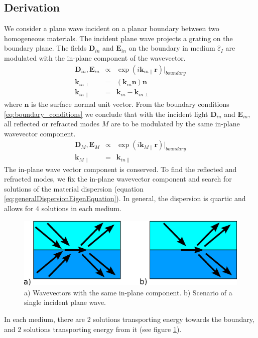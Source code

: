 \documentclass[12pt,a4paper,twoside,openright,BCOR10mm,headsepline,titlepage,abstracton,chapterprefix,final]{scrreprt}
\newcommand\Vector[1]{{\mathbf{#1}}}
\newcommand\Location{\Vector{r}}
\newcommand\wavenumber{k}
\newcommand\Wavevector{\Vector{\wavenumber}}
\newcommand\Tensor[1]{\hat{#1}}
\newcommand\scalarEfield{E}
\newcommand\scalarDfield{D}
\newcommand\Efield{\Vector{\scalarEfield}}
\newcommand\Dfield{\Vector{\scalarDfield}}
\newcommand\permittivity{\Tensor{\scalarpermittivity}}
\newcommand\scalarpermittivity{\varepsilon}
\newcommand\materialone{I}
\begin{document}
\subsection{Derivation}
We consider a plane wave incident on a planar boundary between two homogeneous materials.
The incident plane wave projects a grating on the boundary plane. 
The fields $\Dfield_{in}$ and $\Efield_{in}$ on the boundary in medium $\permittivity_\materialone$ are modulated with the in-plane component of the wavevector. 
\begin{eqnarray}
 \Dfield_{in}, \Efield_{in} &\propto& \exp( i \Wavevector_{in\parallel} \Location)|_{boundary} \\
 \Wavevector_{in\perp} &=& ( \Wavevector_{in} \Vector{n} ) \Vector{n} \\
 \Wavevector_{in\parallel} &=& \Wavevector_{in} - \Wavevector_{in\perp}
\end{eqnarray}
where $\Vector{n}$ is the surface normal unit vector.
From the boundary conditions \ref{eq:boundary_conditions} we conclude that with the incident light $\Dfield_{in}$ and $\Efield_{in}$, 
all reflected or refracted modes $M$ are to be modulated by the same in-plane wavevector component.
\begin{eqnarray}
  \Dfield_{M}, \Efield_{M} &\propto& \exp( i \Wavevector_{M\parallel} \Location)|_{boundary} \\
  \Wavevector_{M\parallel} &=& \Wavevector_{in\parallel}
\end{eqnarray}
The in-plane wave vector component is conserved.
To find the reflected and refracted modes, 
we fix the in-plane wavevector component and search for solutions of the material dispersion
(equation \ref{eq:generalDispersionEigenEquation}).
In general, the dispersion is quartic and allows for 4 solutions in each medium.
\begin{figure}
  \centering
   \includegraphics[width=0.5\columnwidth]{boundary_wavevectors}
  \caption{a) Wavevectors with the same in-plane component.
           b) Scenario of a single incident plane wave.}
  \label{fig:boundary_wavevectors}
\end{figure}
In each medium, there are 2 solutions transporting energy towards the boundary, 
and 2 solutions transporting energy from it (see figure \ref{fig:boundary_wavevectors}).
\end{document}
